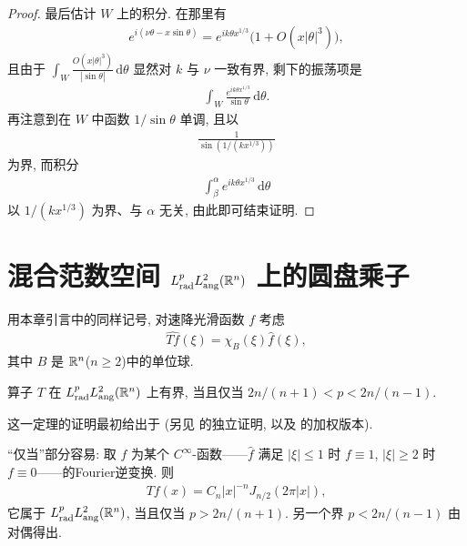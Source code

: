 \begin{proof}
最后估计 $W$ 上的积分. 在那里有
\begin{align*}
  e^{i(\nu\theta-x\sin\theta)}=e^{ik\theta x^{1/3}}\bigl(1+O(x|\theta|^{3})\bigr),
\end{align*}
且由于 $\int_{W}\frac{O(x|\theta|^{3})}{|\sin\theta|}\,\mathrm{d}\theta$ 显然对 $k$ 与 $\nu$ 一致有界, 剩下的振荡项是
\begin{align*}
  \int_{W}\frac{e^{ik\theta x^{1/3}}}{\sin\theta}\,\mathrm{d}\theta.
\end{align*}
再注意到在 $W$ 中函数 $1/\sin\theta$ 单调, 且以
\begin{align*}
  \frac{1}{\sin(1/(kx^{1/3}))}
\end{align*}
为界, 而积分
\begin{align*}
  \int_{\beta}^{\alpha}e^{i k\theta x^{1/3}}\,\mathrm{d}\theta
\end{align*}
以 $1/(kx^{1/3})$ 为界、与 $\alpha$ 无关, 由此即可结束证明.
\end{proof}

\section{\texorpdfstring{混合范数空间 $L^p_{\mathrm{rad}}L^2_{\mathrm{ang}}(\mathbb{R}^n)$ 上的圆盘乘子}{混合范数空间 𝐿ᵖ_{𝑟𝑎𝑑}𝐿²_{𝑎𝑛𝑔}(ℝⁿ) 上的圆盘乘子}}

用本章引言中的同样记号, 对速降光滑函数 $f$ 考虑
\begin{align*}
  \widehat{Tf}(\xi)=\chi_{B}(\xi)\widehat{f}(\xi),
\end{align*}
其中 $B$ 是 $\mathbb{R}^n$($n \geq 2$)中的单位球.

\begin{theorem}\label{thm:6.2}
算子 $T$ 在 $L_{\mathrm{rad}}^{p}L_{\mathrm{ang}}^{2}(\mathbb{R}^{n})$ 上有界, 当且仅当 $2n/(n+1) < p < 2n/(n-1)$.
\end{theorem}

这一定理的证明最初给出于 \cite{b134}(另见 \cite{b139} 的独立证明, 以及 \cite{b133} 的加权版本).

``仅当''部分容易: 取 $f$ 为某个 $C^\infty$-函数——$\widehat{f}$ 满足 $|\xi| \leq 1$ 时 $f \equiv 1$, $|\xi| \geq 2$ 时 $f \equiv 0$——的Fourier逆变换. 则
\begin{align*}
  T f(x)=C_{n}\left|x\right|^{-n}J_{n/2}(2\pi|x|),
\end{align*}
它属于 $L_{\mathrm{rad}}^{p}L_{\mathrm{ang}}^{2}(\mathbb{R}^{n})$, 当且仅当 $p > 2n/(n+1)$. 另一个界 $p < 2n/(n-1)$ 由对偶得出.

